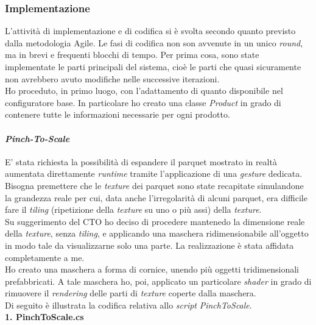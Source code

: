\subsubsection{Implementazione}
L'attivit\`a di implementazione e di codifica si \`e svolta secondo quanto previsto dalla metodologia Agile. Le fasi di codifica non son avvenute in un unico \textit{round}, ma in brevi e frequenti blocchi di tempo. Per prima cosa, sono state implementate le parti principali del sistema, cio\`e le parti che quasi sicuramente non avrebbero avuto modifiche nelle successive iterazioni.\\

Ho proceduto, in primo luogo, con l'adattamento di quanto disponibile nel configuratore base. In particolare ho creato una classe \textit{Product} in grado di contenere tutte le informazioni necessarie per ogni prodotto.\\

\paragraph{\textit{Pinch-To-Scale}}
E' stata richiesta la possibilit\`a di espandere il parquet mostrato in realt\`a aumentata direttamente \textit{runtime} tramite l'applicazione di una \textit{gesture} dedicata.\\
Bisogna premettere che le \textit{texture\gloss} dei parquet sono state recapitate simulandone la grandezza reale per cui, data anche l'irregolarit\`a di alcuni parquet, era difficile fare il \textit{tiling} (ripetizione della \textit{texture\gloss} su uno o pi\`u assi) della \textit{texture\gloss}.\\
Su suggerimento del CTO ho deciso di procedere mantenedo la dimensione reale della \textit{texture\gloss}, senza \textit{tiling}, e applicando una maschera ridimensionabile all'oggetto in modo tale da visualizzarne solo una parte. La realizzazione \`e stata affidata completamente a me.\\
Ho creato una maschera a forma di cornice, unendo pi\`u oggetti tridimensionali prefabbricati. A tale maschera ho, poi, applicato un particolare \textit{shader} in grado di rimuovere il \textit{rendering} delle parti di \textit{texture\gloss} coperte dalla maschera.\\
Di seguito \`e illustrata la codifica relativa allo \textit{script} \textit{PinchToScale}.\\
\noindent
\textbf{1. PinchToScale.cs}

